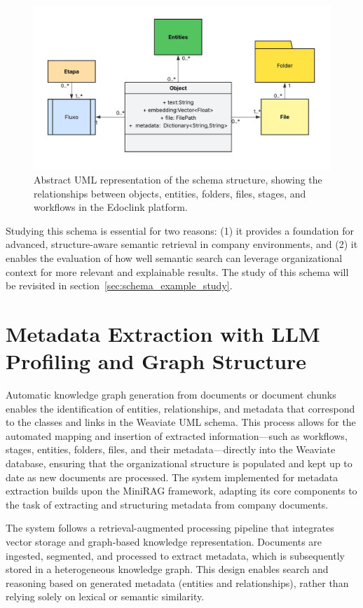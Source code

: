 \begin{figure}[h!]
    \centering
    \includegraphics[width=1\linewidth]{Images/Classe UML.jpeg}
    \caption{Abstract UML representation of the schema structure, showing the relationships between objects, entities, folders, files, stages, and workflows in the Edoclink platform.}
    \label{fig:weaviate_class}
\end{figure}

Studying this schema is essential for two reasons: (1) it provides a foundation for advanced, structure-aware semantic retrieval in company environments, and (2) it enables the evaluation of how well semantic search can leverage organizational context for more relevant and explainable results. The study of this schema will be revisited in section~\ref{sec:schema_example_study}.

\section{Metadata Extraction with \gls{LLM} Profiling and Graph Structure}
\label{sec:metadata_extraction}
Automatic knowledge graph generation from documents or document chunks enables the identification of entities, relationships, and metadata that correspond to the classes and links in the Weaviate UML schema. This process allows for the automated mapping and insertion of extracted information—such as workflows, stages, entities, folders, files, and their metadata—directly into the Weaviate database, ensuring that the organizational structure is populated and kept up to date as new documents are processed.
The system implemented for metadata extraction builds upon the MiniRAG framework, adapting its core components to the task of extracting and structuring metadata from company documents.

The system follows a retrieval-augmented processing pipeline that integrates vector storage and graph-based knowledge representation.  
Documents are ingested, segmented, and processed to extract metadata, which is subsequently stored in a heterogeneous knowledge graph.  
This design enables search and reasoning based on generated metadata (entities and relationships), rather than relying solely on lexical or semantic similarity.

